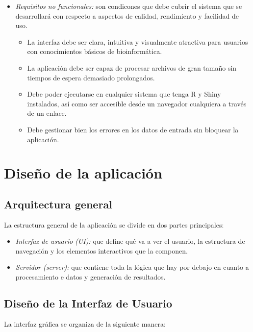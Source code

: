 \begin{itemize}
    \item \textit{Requisitos no funcionales:} son condicones que debe cubrir el sistema que se desarrollará con respecto a aspectos de calidad, rendimiento y
    facilidad de uso.
    \begin{itemize}
        \item La interfaz debe ser clara, intuitiva y visualmente atractiva para usuarios con conocimientos básicos de bioinformática.
        \item La aplicación debe ser capaz de procesar archivos de gran tamaño sin tiempos de espera demasiado prolongados.
        \item Debe poder ejecutarse en cualquier sistema que tenga R y Shiny instalados, así como ser accesible desde un navegador cualquiera a través de un enlace.
        \item Debe gestionar bien los errores en los datos de entrada sin bloquear la aplicación.
    \end{itemize}
\end{itemize}

\section{Diseño de la aplicación}

\subsection{Arquitectura general}

La estructura general de la aplicación se divide en dos partes principales:

\begin{itemize}
    \item \textit{Interfaz de usuario (UI):} que define qué va a ver el usuario, la estructura de navegación y los elementos interactivos que la 
    componen.
    \item \textit{Servidor (server):} que contiene toda la lógica que hay por debajo en cuanto a procesamiento e datos y generación de resultados.
\end{itemize}

\subsection{Diseño de la Interfaz de Usuario}

La interfaz gráfica se organiza de la siguiente manera: 

